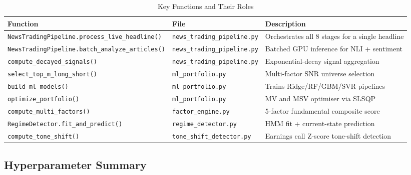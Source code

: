 \documentclass[12pt, a4paper]{article}
\begin{document}
\begin{table}[H]
\centering
\caption{Key Functions and Their Roles}
\renewcommand{\arraystretch}{1.3}
\small
\begin{tabular}{@{}p{5cm}p{3cm}p{5.5cm}@{}}
\toprule
\textbf{Function} & \textbf{File} & \textbf{Description} \\ \midrule
\texttt{NewsTradingPipeline.process\_live\_headline()} & \texttt{news\_trading\_pipeline.py} & Orchestrates all 8 stages for a single headline \\
\texttt{NewsTradingPipeline.batch\_analyze\_articles()} & \texttt{news\_trading\_pipeline.py} & Batched GPU inference for NLI + sentiment \\
\texttt{compute\_decayed\_signals()} & \texttt{news\_trading\_pipeline.py} & Exponential-decay signal aggregation \\
\texttt{select\_top\_m\_long\_short()} & \texttt{ml\_portfolio.py} & Multi-factor SNR universe selection \\
\texttt{build\_ml\_models()} & \texttt{ml\_portfolio.py} & Trains Ridge/RF/GBM/SVR pipelines \\
\texttt{optimize\_portfolio()} & \texttt{ml\_portfolio.py} & MV and MSV optimiser via SLSQP \\
\texttt{compute\_multi\_factors()} & \texttt{factor\_engine.py} & 5-factor fundamental composite score \\
\texttt{RegimeDetector.fit\_and\_predict()} & \texttt{regime\_detector.py} & HMM fit + current-state prediction \\
\texttt{compute\_tone\_shift()} & \texttt{tone\_shift\_detector.py} & Earnings call Z-score tone-shift detection \\
\bottomrule
\end{tabular}
\end{table}

\subsection{Hyperparameter Summary}
\end{document}

